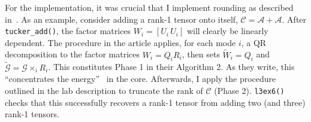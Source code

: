 \documentclass{article}
\begin{document}
For the implementation, it was crucial that I implement rounding as
described in~\cite{smith.etal_2026}.
As an example, consider adding a rank-1 tensor onto itself,
\(\mathcal{C}=\mathcal{A}+\mathcal{A}\).
After \verb|tucker_add()|, the factor matrices \(W_i = [U_i \, U_i]\)
will clearly be linearly dependent.
The procedure in the article applies, for each mode \(i\), a QR
decomposition to the factor matrices \(W_i = Q_i R_i\), then sets
\(\tilde{W}_i= Q_i\) and \(\tilde{\mathcal{G}} = \mathcal{G}\times_i R_i\).
This constitutes Phase 1 in their Algorithm 2.
As they write, this ``concentrates the
energy''~\cite[7]{smith.etal_2026} in the core.
Afterwards, I apply the procedure outlined in the lab
description to truncate the rank of \(\mathcal{C}\) (Phase 2).
\verb|l3ex6()| checks that this successfully recovers a rank-1 tensor
from adding two (and three) rank-1 tensors.

\printbibliography{}
\end{document}
